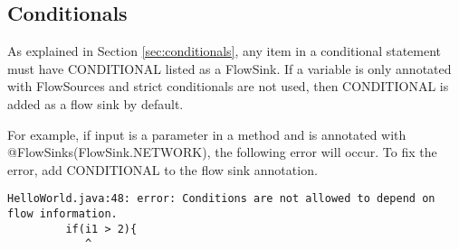 \subsection{Conditionals}
As explained in Section \ref{sec:conditionals}, any item in a conditional statement must have CONDITIONAL listed as a FlowSink.  If a variable is only annotated with FlowSources and strict conditionals are not used, then CONDITIONAL is added as a flow sink by default. 

For example, if input is a parameter in a method and is annotated with @FlowSinks(FlowSink.NETWORK), the following error will occur.  To fix the error, add CONDITIONAL to the flow sink annotation.  

\begin{Verbatim}
HelloWorld.java:48: error: Conditions are not allowed to depend on flow information.
         if(i1 > 2){
            ^
\end{Verbatim}




